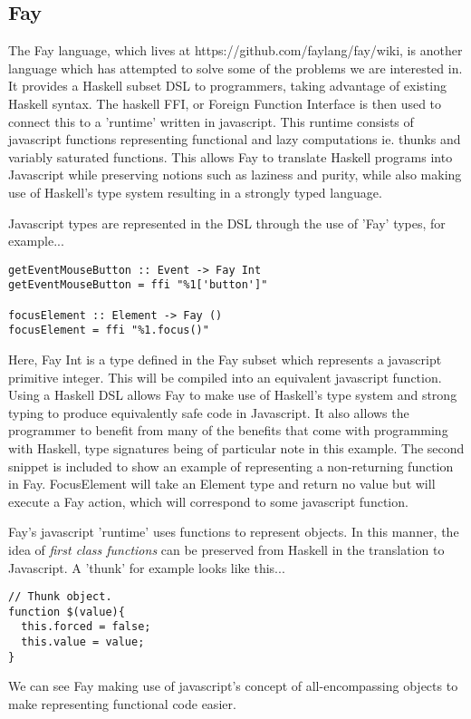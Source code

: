 \documentclass[11pt]{article}
\begin{document}
\subsection{Fay}
The Fay language, which lives at https://github.com/faylang/fay/wiki, is
another language which has attempted to solve some of the problems we
are interested in. It provides a Haskell subset DSL to programmers, taking
advantage of existing Haskell syntax. The haskell FFI, or Foreign Function
Interface is then used to connect this to a 'runtime' written in javascript.
This runtime consists of javascript functions representing functional and
lazy computations ie. thunks and variably saturated functions. This allows
Fay to translate Haskell programs into Javascript while preserving notions
such as laziness and purity, while also making use of Haskell's type system
resulting in a strongly typed language.

Javascript types are represented in the DSL through the use of 'Fay' types,
for example...
\begin{verbatim}
getEventMouseButton :: Event -> Fay Int
getEventMouseButton = ffi "%1['button']"

focusElement :: Element -> Fay ()
focusElement = ffi "%1.focus()"
\end{verbatim}
Here, Fay Int is a type defined in the Fay subset which represents a javascript
primitive integer. This will be compiled into an equivalent javascript function. 
Using a Haskell DSL allows Fay to make use of Haskell's type system and strong
typing to produce equivalently safe code in Javascript. It also allows the
programmer to benefit from many of the benefits that come with programming with
Haskell, type signatures being of particular note in this example. The second
snippet is included to show an example of representing a non-returning function
in Fay. FocusElement will take an Element type and return no value but will
execute a Fay action, which will correspond to some javascript function.

Fay's javascript 'runtime' uses functions to represent objects. In this manner,
the idea of \emph{first class functions} can be preserved from Haskell in the
translation to Javascript. A 'thunk' for example looks like this...
\begin{verbatim}
// Thunk object.
function $(value){
  this.forced = false;
  this.value = value;
}
\end{verbatim}
We can see Fay making use of javascript's concept of all-encompassing objects to
make representing functional code easier. 
\end{document}
